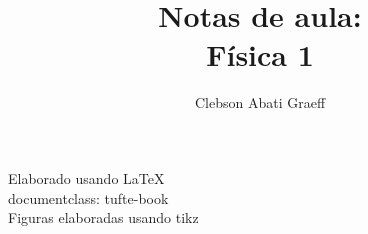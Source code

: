 \documentclass[justified,a4paper,symmetric,nobib]{tufte-book}
\title{Notas de aula: \\ Física 1}
\author{Clebson Abati Graeff}
\begin{document}


\mainmatter

%
%

%
%
%
%

%

\printbibliography

\cleardoublepage
\thispagestyle{empty}
\mbox{}
\vfill
\begin{fullwidth}
\begin{center}\sc
Elaborado usando \LaTeX \\
documentclass: tufte-book \\
Figuras elaboradas usando tikz
\end{center}
\end{fullwidth}
\end{document}
